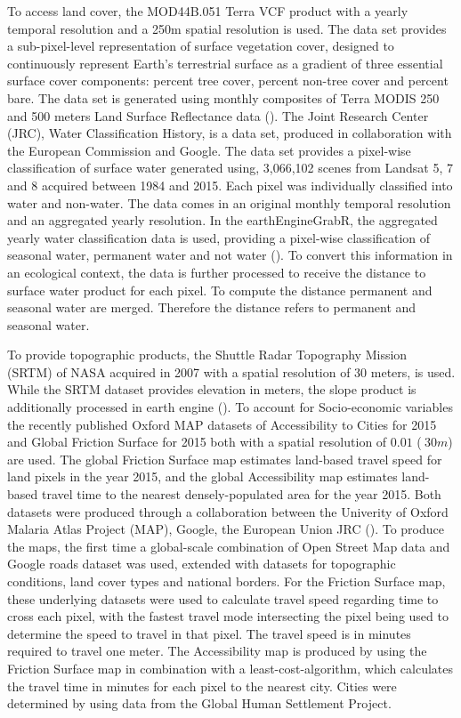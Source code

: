 To access land cover, the MOD44B.051 Terra VCF product with a yearly temporal resolution and a 250m spatial resolution is used. The data set provides a sub-pixel-level representation of surface vegetation cover, designed to continuously represent Earth's terrestrial surface as a gradient of three essential surface cover components: percent tree cover, percent non-tree cover and percent bare. The data set is generated using monthly composites of Terra MODIS 250 and 500 meters Land Surface Reflectance data (\cite{hansen2006vegetation}).
The Joint Research Center (JRC), Water Classification History, is a data set, produced in collaboration with the European Commission and Google. The data set provides a pixel-wise classification of surface water generated using, 3,066,102 scenes from Landsat 5, 7 and 8 acquired between 1984 and 2015. Each pixel was individually classified into water and non-water. The data comes in an original monthly temporal resolution and an aggregated yearly resolution. In the earthEngineGrabR, the aggregated yearly water classification data is used, providing a pixel-wise classification of seasonal water, permanent water and not water (\cite{pekel2016high}). To convert this information in an ecological context, the data is further processed to receive the distance to surface water product for each pixel. To compute the distance permanent and seasonal water are merged. Therefore the distance refers to permanent and seasonal water.

To provide topographic products, the Shuttle Radar Topography Mission (SRTM) of NASA acquired in 2007 with a spatial resolution of 30 meters, is used. While the SRTM dataset provides elevation in meters, the slope product is additionally processed in earth engine (\cite{farr2007shuttle}). To account for Socio-economic variables the recently published Oxford MAP datasets of Accessibility to Cities for 2015 and Global Friction Surface for 2015 both with a spatial resolution of $0.01$ ($~ 30m$) are used. The global Friction Surface map estimates land-based travel speed for land pixels in the year 2015, and the global Accessibility map estimates land-based travel time to the nearest densely-populated area for the year 2015. Both datasets were produced through a collaboration between the Univerity of Oxford Malaria Atlas Project (MAP), Google, the European Union JRC (\cite{weiss2018global}). To produce the maps, the first time a global-scale combination of Open Street Map data and Google roads dataset was used, extended with datasets for topographic conditions, land cover types and national borders.
For the Friction Surface map, these underlying datasets were used to calculate travel speed regarding time to cross each pixel, with the fastest travel mode intersecting the pixel being used to determine the speed to travel in that pixel. The travel speed is in minutes required to travel one meter. The Accessibility map is produced by using the Friction Surface map in combination with a least-cost-algorithm, which calculates the travel time in minutes for each pixel to the nearest city. Cities were determined by using data from the Global Human Settlement Project.  

